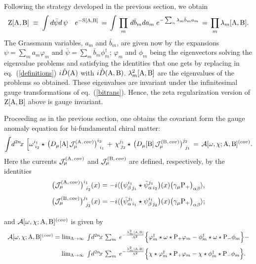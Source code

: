 \documentclass[a4paper,12pt]{article}
\def\cA{{\cal A}}
\def\cJ{{\cal J}}
\def\A{{\rm A}}
\def\B{{\rm B}}
\def\Z{{\rm Z}}
\def\idxn{\int\! d^{2n}\!x \,}
\begin{document}
Following the strategy developed in the previous section, we obtain
\begin{displaymath}
\Z[\A, \B] \;\equiv\;\int  d\bar{\psi}d\,\psi\quad e^{-{\rm S}[\A,\B]}\,=\,
\int\,\prod_{m}\,d{\bar b}_m da_m\; e^{-\sum_{n}\lambda_m {\bar b}_m a_m}\,=\,
\prod_{m}\lambda_m[\A,\B].
\end{displaymath}
The Grassmann variables, $a_m$ and ${\bar b}_m$, are given now by
the expansions $\psi=\sum_{m}a_m\varphi_m$ and $\bar{\psi}=\sum_{m}\bar{b}_m\phi_m^{\dagger}$; $\varphi_m$ and $\phi_m$ being the eigenvectors solving 
the eigenvalue problems and satisfying the identities that one gets by  replacing in eq.~(\ref{definitions}) $i\hat{D}(\A)$  with $i\hat{D}(\A,\B)$. 
$\lambda_m^2[\A,\B]$ are the eigenvalues of the problems so obtained. These 
eigenvalues are invariant under the infinitesimal gauge transformations of eq.~(\ref{bitrans}). Hence, the zeta 
regularization version of $\Z[\A, \B]$ above is gauge invariant.

Proceeding as in the previous section, one obtains the covariant form the 
gauge anomaly equation for bi-fundamental chiral matter:
\begin{equation}
\idxn\,\Big[\omega^{i_1}_{\;i_2}\star\, 
\big(D_{\mu}[\A]\,\cJ^{(\A,\,cov)}_\mu\big)^{i_2}_{\;\,i_1}\,+\,
\chi^{j_1}_{\;j_2}\star\, 
\big(D_{\mu}[\B]\,\cJ^{(\B,\, cov)}_\mu\big)^{j_2}_{\;\,j_1}
\,=\,\cA[\omega,\chi;\A,\B]^{(cov)}.
\label{bianom}
\end{equation}
Here the currents $\cJ^{(\A,\,cov)}_\mu$ and 
$\cJ^{(\B,\,cov)}_\mu$ 
are  defined, respectively, by the identities 
\begin{equation}
\begin{array}{c}
{\big(\cJ^{(\A,\,cov)}_\mu\big)^{i_1}_{\;\,i_2}(x)=
-i\langle \big(\psi^{i_1}_{\beta\,j_1}\star\bar{\psi}^{j_1}_{\alpha\,i_2}\big)(x)
\big(\gamma_{\mu}{\rm P}_{+}\big)_{\alpha\beta}\rangle,
}\\[9pt]
{\big(\cJ^{(\B,\,cov)}_\mu\big)^{j_1}_{\;\,j_2}(x)=
-i\langle \big(\bar{\psi}^{j_1}_{\alpha\,i_1}\star \psi^{i_1}_{\beta\,j_2}\big)(x)
\big(\gamma_{\mu}{\rm P}_{+}\big)_{\alpha\beta}\rangle;}\\[9pt]
\end{array}
\label{bicurrents}
\end{equation}
and $\cA[\omega,\chi;\A,\B]^{(cov)}$ is given by
\begin{equation}
\begin{array}{l}
{\cA[\omega,\chi;\A,\B]^{(cov)}=\mbox{lim}_{\Lambda\rightarrow\infty}\;
\idxn\sum_m\;
e^{-\frac{\lambda_m^2[\A,\B]}{\Lambda^2}}\Big\{\varphi_m^{\dagger}\star\omega\star
{\rm P}_{+}\varphi_m
-\phi_m^{\dagger}\star\omega\star
{\rm P}_{-}\phi_m\Big\}-}\\[9pt]
{\phantom{\cA[\omega,\chi;\A,\B]^{(cov)}=\;}
\mbox{lim}_{\Lambda\rightarrow\infty}\;
\idxn\sum_m\;
e^{-\frac{\lambda_m^2[\A,\B]}{\Lambda^2}}\Big\{\chi\star\varphi_m^{\dagger}
\star{\rm P}_{+}\varphi_m
-\chi\star\phi_m^{\dagger}\star{\rm P}_{-}\phi_m\Big\}.}\\[9pt]
\end{array}
\label{bianomaly}
\end{equation}
\end{document}
